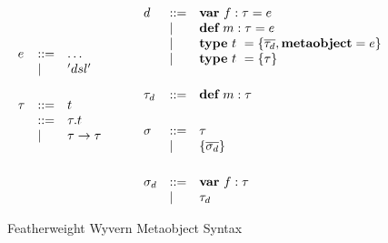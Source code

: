 \begin{figure}
\centering
\[
\begin{array}{lll}

e    & ::= & \ldots \\
     & \mathrel{\mid} & 'dsl' \\
\\[1ex]

\tau & ::= & t\\
     & ::= & \tau.t\\
     & \mathrel{\mid} & \tau \rightarrow \tau \\
\\[1ex]
	 
\end{array}
\begin{array}{lll}
~~~~
\end{array}
\begin{array}{lll}
	 
d    & ::= & \textbf{var}~ f:\tau = e \\
     & \mathrel{\mid} & \textbf{def}~ m:\tau = e \\
     & \mathrel{\mid} & \textbf{type}~ t~ = \{ \overline{\tau_d}, \textbf{metaobject}=e \} \\
     & \mathrel{\mid} & \textbf{type}~ t~ = \{ \tau \}  \\
\\[1ex]

\tau_d   & ::= & \textbf{def}~ m:\tau \\
\\[1ex]

\sigma & ::= & \tau \\
       & \mathrel{\mid} & \{ \overline{\sigma_d} \} \\
\\[1ex]

\sigma_d & ::= & \textbf{var}~ f:\tau \\
         & \mathrel{\mid} & \tau_d \\

\end{array}
\]
\caption{Featherweight Wyvern Metaobject Syntax}
\label{fig:meta-syntax}
\end{figure}
